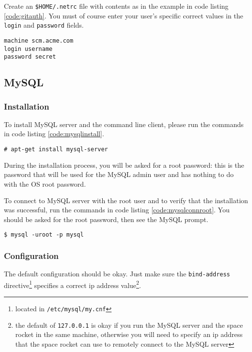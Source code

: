 Create an \texttt{\$HOME/.netrc} file with contents as in the example in
code listing \ref{code:gitauth}. You must of course enter your user's
specific correct values in the \texttt{login} and \texttt{password}
fields.

\begin{lstlisting}[label=code:gitauth,caption=An example \texttt{\$HOME/.netrc} file]
machine scm.acme.com
login username
password secret
\end{lstlisting}

\subsection{MySQL}
\subsubsection{Installation}

To install MySQL server and the command line client, please run the
commands in code listing \ref{code:mysqlinstall}.

\begin{lstlisting}[label=code:mysqlinstall,caption=Installing MySQL]
# apt-get install mysql-server
\end{lstlisting}

During the installation process, you will be asked for a root password:
this is the password that will be used for the MySQL admin user and has
nothing to do with the \ac{OS} root password.

To connect to MySQL server with the root user and to verify that the
installation was successful, run the commands in code listing
\ref{code:mysqlconnroot}. You should be asked for the root password,
then see the MySQL prompt.

\begin{lstlisting}[label=code:mysqlconnroot,caption=Connecting to MySQL server as the root user]
$ mysql -uroot -p mysql
\end{lstlisting}

\subsubsection{Configuration}

The default configuration should be okay. Just make sure the
\texttt{bind-address} directive\footnote{located in
\texttt{/etc/mysql/my.cnf}} specifies a correct ip address
value\footnote{the default of \texttt{127.0.0.1} is okay if you run the
MySQL server and the space rocket in the same machine, otherwise you
will need to specify an ip address that the space rocket can use to
remotely connect to the MySQL server}. 

